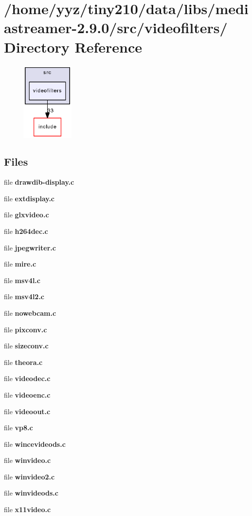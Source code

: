 \section{/home/yyz/tiny210/data/libs/mediastreamer-\/2.9.0/src/videofilters/ Directory Reference}
\label{dir_86a435a375fd4b93280c40e15127353a}


\nopagebreak
\begin{figure}[H]
\begin{center}
\leavevmode
\includegraphics[width=74pt]{dir_86a435a375fd4b93280c40e15127353a_dep}
\end{center}
\end{figure}
\subsection*{Files}
\begin{DoxyCompactItemize}
\item 
file {\bfseries drawdib-\/display.c}
\item 
file {\bfseries extdisplay.c}
\item 
file {\bfseries glxvideo.c}
\item 
file {\bfseries h264dec.c}
\item 
file {\bfseries jpegwriter.c}
\item 
file {\bfseries mire.c}
\item 
file {\bfseries msv4l.c}
\item 
file {\bfseries msv4l2.c}
\item 
file {\bfseries nowebcam.c}
\item 
file {\bfseries pixconv.c}
\item 
file {\bfseries sizeconv.c}
\item 
file {\bfseries theora.c}
\item 
file {\bfseries videodec.c}
\item 
file {\bfseries videoenc.c}
\item 
file {\bfseries videoout.c}
\item 
file {\bfseries vp8.c}
\item 
file {\bfseries wincevideods.c}
\item 
file {\bfseries winvideo.c}
\item 
file {\bfseries winvideo2.c}
\item 
file {\bfseries winvideods.c}
\item 
file {\bfseries x11video.c}
\end{DoxyCompactItemize}
